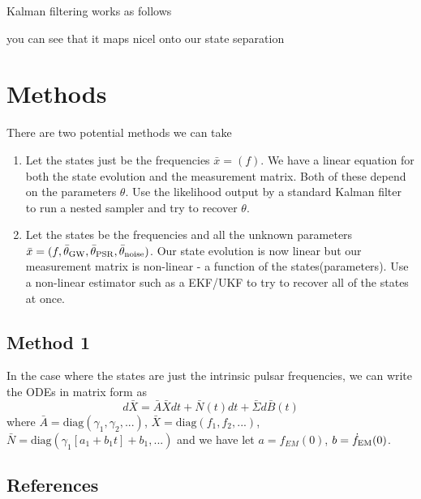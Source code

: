 \documentclass[fleqn,usenatbib,useAMS]{mnras}
\begin{document}
Kalman filtering works as follows


you can see that it maps nicel onto our state separation 





\section{Methods}


There are two potential methods we can take

\begin{enumerate}
	\item Let the states just be the frequencies $\bar{x} = (f)$. We have a linear equation for both the state evolution and the measurement matrix. Both of these depend on the parameters $\theta$. Use the likelihood output by a standard Kalman filter to run a nested sampler and try to recover $\theta$.
	\item Let the states be the frequencies and all the unknown parameters $\bar{x} = (f, \bar{\theta}_{\rm GW},\bar{\theta}_{\rm PSR},\bar{\theta}_{\rm noise})$. Our state evolution is now linear but our measurement matrix is non-linear - a function of the states(parameters). Use a non-linear estimator such as a EKF/UKF to try to recover all of the states at once.
\end{enumerate}


\subsection{Method 1}


In the case where the states are just the intrinsic pulsar frequencies, we can write the ODEs in matrix form as
\begin{equation}
	d\bar{X} = \bar{A} \bar{X} dt + \bar{N}(t) dt + \bar{\Sigma} d\bar{B}(t) 
\end{equation}
where $\bar{A} = \text{diag}(\gamma_1, \gamma_2,...)$,  $\bar{X} = \text{diag}(f_1, f_2,...)$, $\bar{N} =\text{diag}(\gamma_1[a_1+b_1t] + b_1, ...)$
and we have let $a = f_{EM}(0)$, $b = \dot{f}_{\rm EM}(0)$.


\subsection{References}
\label{sec:ref_list}













\bsp	%
\label{lastpage}
\end{document}
